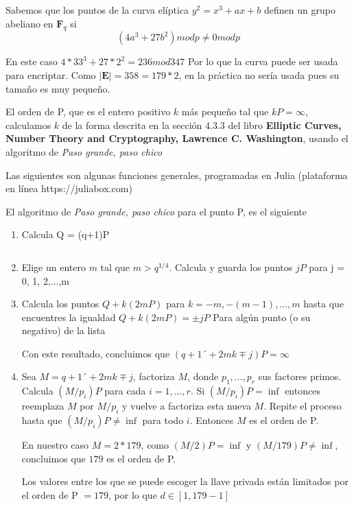 
Sabemos que los puntos de la curva elíptica $y^{2} = x^{3} + ax +b$ definen un grupo abeliano en $\mathbf{F}_{q}$ si 
\begin{equation}
    (4a^{3} + 27b^{2}) mod p \neq 0 mod p
\end{equation}

En este caso $4*33^{3} + 27*2^{2} = 236 mod 347$
Por lo que la curva puede ser usada para encriptar.
Como $|\mathbf{E}| = 358 = 179*2$, en la práctica no sería usada pues su tamaño es muy pequeño.

El orden de P, que es el entero positivo $k$  más pequeño tal que  $kP = \infty$, calculamos $k$ de la forma descrita en la sección 4.3.3 del libro \textbf{Elliptic Curves, Number Theory  and  Cryptography, Lawrence  C. Washington}, usando el algoritmo de \textit{Paso grande, paso chico}

Las siguientes son algunas funciones generales, programadas en Julia (plataforma en línea https://juliabox.com)



El algoritmo de \textit{Paso grande, paso chico} para el punto P, es el siguiente
\begin{enumerate}
    \item Calcula Q = (q+1)P
    \inputminted{python}{4a_1.py}
    
    \item Elige un entero $m$ tal que  $m>q^{1/4}$. Calcula y guarda los puntos $jP$ para j = 0, 1, 2,...,m
    
    
    \item Calcula los puntos $ Q + k(2mP)$ para $k = −m, −(m − 1),...,m$ hasta que encuentres la igualdad $Q+k(2mP) = \pm jP$ Para algún punto (o su negativo) de la lista
    
    
    Con este resultado, concluimos que $(q + 1 ´+2mk \mp j) P = \infty$
    
    \item  Sea $ M = q + 1 ´+2mk \mp j$, factoriza $M$, donde $p_{1},...,p_{r}$ sus factores primos. 
    Calcula $(M/p_{i})P$ para cada $i = 1,...,r$. Si $(M/p_{i})P = \inf$ entonces reemplaza $M$ por $M/p_{i}$ y vuelve a factoriza esta nueva $M$. Repite el proceso hasta que $(M/p_{i})P \neq \inf$ para todo $i$. Entonces $M$ es el orden de P.
    
    En nuestro caso $M = 2*179$, como $(M/2)P = \inf$ y $(M/179)P \neq \inf$, concluimos que $179$ es el orden de P. 
    
    Los valores entre los que se puede escoger la llave privada están limitados por el orden de P $ = 179$, por lo que $d \in [1,179-1]$
    
    
    
\end{enumerate}